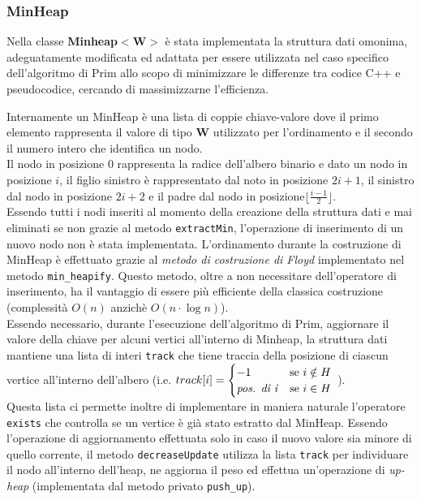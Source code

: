 \documentclass[]{article}
\begin{document}
\subsubsection{MinHeap}
Nella classe \textbf{Minheap$<$W$>$} è stata implementata la struttura dati omonima, adeguatamente modificata ed adattata per essere utilizzata nel caso specifico dell'algoritmo di Prim allo scopo di minimizzare le differenze tra codice C++ e pseudocodice, cercando di massimizzarne l'efficienza.\smallskip
\begin{flushleft}
Internamente un MinHeap è una lista di coppie chiave-valore dove il primo elemento rappresenta il valore di tipo \textbf{W} utilizzato per l'ordinamento e il secondo il numero intero che identifica un nodo.\\
Il nodo in posizione 0 rappresenta la radice dell'albero binario e dato un nodo in posizione $i$, il figlio sinistro è rappresentato dal noto in posizione $2i+1$, il sinistro dal nodo in posizione $2i+2$ e il padre dal nodo in posizione$\lfloor \frac{i-1}{2}\rfloor$.\\
Essendo tutti i nodi inseriti al momento della creazione della struttura dati e mai eliminati se non grazie al metodo \verb|extractMin|, l'operazione di inserimento di un nuovo nodo non è stata implementata.
L'ordinamento durante la costruzione di MinHeap è effettuato grazie al \textit{metodo di costruzione di Floyd} implementato nel metodo \verb|min_heapify|. Questo metodo, oltre a non necessitare dell'operatore di inserimento, ha il vantaggio di essere più efficiente della classica costruzione (complessità $O(n)$ anzichè $O(n\cdot\log n)$).\\\smallskip
Essendo necessario, durante l'esecuzione dell'algoritmo di Prim, aggiornare il valore della chiave per alcuni vertici all'interno di Minheap, la struttura dati mantiene una lista di interi \verb|track| che tiene traccia della posizione di ciascun vertice all'interno dell'albero (i.e. $track[i]=\begin{cases}
-1 & \text{se } i \notin H\\
\text{\textit{pos. di i}} & \text{se } i \in H\\
\end{cases}$ ).\\
Questa lista ci permette inoltre di implementare in maniera naturale l'operatore \verb|exists| che controlla se un vertice è già stato estratto dal MinHeap.
Essendo l'operazione di aggiornamento effettuata solo in caso il nuovo valore sia minore di quello corrente, il metodo \verb|decreaseUpdate| utilizza la lista \verb|track| per individuare il nodo all'interno dell'heap, ne aggiorna il peso ed effettua un'operazione di \textit{up-heap} (implementata dal metodo privato \verb|push_up|).
\end{flushleft}
\end{document}
